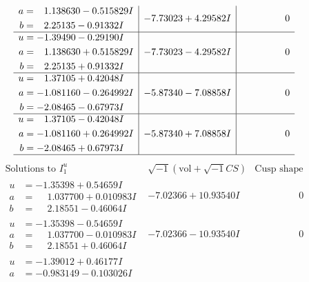 \documentclass[1p]{elsarticle_modified}
\theoremstyle{definition}
\newcommand{\I}{\sqrt{-1}}
\begin{document}
$$\begin{array}{c|c|c}
\begin{aligned}
a &= \phantom{-}1.138630 - 0.515829 I \\
b &= \phantom{-}2.25135 - 0.91332 I\end{aligned}
 & -7.73023 + 4.29582 I & \phantom{-0.000000 } 0 \\ \hline\begin{aligned}
u &= -1.39490 - 0.29190 I \\
a &= \phantom{-}1.138630 + 0.515829 I \\
b &= \phantom{-}2.25135 + 0.91332 I\end{aligned}
 & -7.73023 - 4.29582 I & \phantom{-0.000000 } 0 \\ \hline\begin{aligned}
u &= \phantom{-}1.37105 + 0.42048 I \\
a &= -1.081160 - 0.264992 I \\
b &= -2.08465 - 0.67973 I\end{aligned}
 & -5.87340 - 7.08858 I & \phantom{-0.000000 } 0 \\ \hline\begin{aligned}
u &= \phantom{-}1.37105 - 0.42048 I \\
a &= -1.081160 + 0.264992 I \\
b &= -2.08465 + 0.67973 I\end{aligned}
 & -5.87340 + 7.08858 I & \phantom{-0.000000 } 0\\
 \hline 
 \end{array}$$\newpage$$\begin{array}{c|c|c}  
\text{Solutions to }I^u_{1}& \I (\text{vol} + \sqrt{-1}CS) & \text{Cusp shape}\\
 \hline 
\begin{aligned}
u &= -1.35398 + 0.54659 I \\
a &= \phantom{-}1.037700 + 0.010983 I \\
b &= \phantom{-}2.18551 - 0.46064 I\end{aligned}
 & -7.02366 + 10.93540 I & \phantom{-0.000000 } 0 \\ \hline\begin{aligned}
u &= -1.35398 - 0.54659 I \\
a &= \phantom{-}1.037700 - 0.010983 I \\
b &= \phantom{-}2.18551 + 0.46064 I\end{aligned}
 & -7.02366 - 10.93540 I & \phantom{-0.000000 } 0 \\ \hline\begin{aligned}
u &= -1.39012 + 0.46177 I \\
a &= -0.983149 - 0.103026 I \\

\end{aligned}
\end{array}$$
\end{document}
